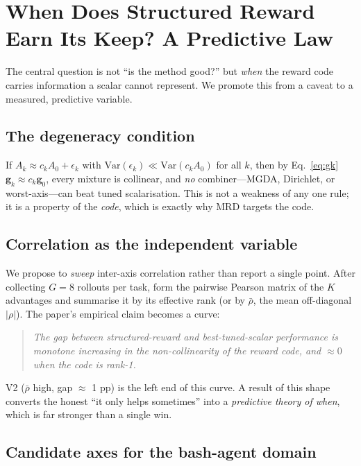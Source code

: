 \documentclass[11pt,a4paper]{article}
\begin{document}
\section{When Does Structured Reward Earn Its Keep? A Predictive Law}
\label{sec:when}

The central question is not ``is the method good?'' but \emph{when} the
reward code carries information a scalar cannot represent.  We promote this
from a caveat to a measured, predictive variable.

\subsection{The degeneracy condition}

If $A_k \approx c_k A_0 + \epsilon_k$ with
$\mathrm{Var}(\epsilon_k) \ll \mathrm{Var}(c_k A_0)$ for all $k$, then by
Eq.~\eqref{eq:gk} $\bm g_k \approx c_k \bm g_0$, every mixture is collinear,
and \emph{no} combiner---MGDA, Dirichlet, or worst-axis---can beat tuned
scalarisation.  This is not a weakness of any one rule; it is a property of
the \emph{code}, which is exactly why MRD targets the code.

\subsection{Correlation as the independent variable}

We propose to \emph{sweep} inter-axis correlation rather than report a single
point.  After collecting $G{=}8$ rollouts per task, form the pairwise Pearson
matrix of the $K$ advantages and summarise it by its effective rank (or by
$\bar\rho$, the mean off-diagonal $|\rho|$).  The paper's empirical claim
becomes a curve:
\begin{quote}
\emph{The gap between structured-reward and best-tuned-scalar performance
is monotone increasing in the non-collinearity of the reward code, and
$\approx 0$ when the code is rank-1.}
\end{quote}
V2 ($\bar\rho$ high, gap $\approx$ 1 pp) is the left end of this curve.  A
result of this shape converts the honest ``it only helps sometimes'' into a
\emph{predictive theory of when}, which is far stronger than a single win.

\subsection{Candidate axes for the bash-agent domain}
\end{document}
